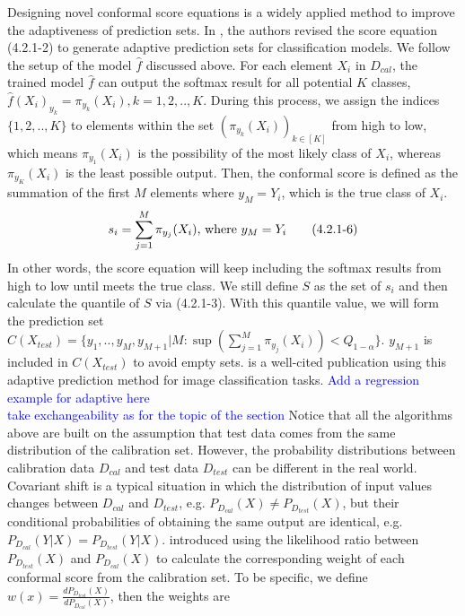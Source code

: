 \noindent Designing novel conformal score equations is a widely applied method to improve the adaptiveness of prediction sets. In \cite{romano2020classification}, the authors revised the score equation (4.2.1-2) to generate adaptive prediction sets for classification models.  We follow the setup of the model $\hat{f}$ discussed above. For each element $X_i$ in $D_{cal}$, the trained model $\hat{f}$ can output the softmax result for all potential $K$ classes, $\hat{f}(X_i)_{y_k}=\pi_{y_k}(X_i), k=1,2,..,K$.  During this process, we assign the indices $\{1,2,.., K\}$ to elements within the set $(\pi_{y_k}(X_i))_{k\in[K]}$ from high to low, which means $\pi_{y_1}(X_i)$ is the possibility of the most likely class of $X_i$, whereas $\pi_{y_K}(X_i)$ is the least possible output.  Then, the conformal score is defined as the summation of the first $M$ elements where $y_M=Y_i$, which is the true class of $X_i$. 
\begin{equation}
s_i = \sum_{j=1}^M \pi_{y_j}(X_i)\text{, where } y_M=Y_i\\\tag{4.2.1-6}
\end{equation}
In other words, the score equation will keep including the softmax results from high to low until meets the true class. We still define $S$ as the set of $s_i$ and then calculate the quantile of $S$ via (4.2.1-3). With this quantile value, we will form the prediction set $C(X_{test})=\{y_1,..,y_M,y_{M+1}|M:\sup(\sum_{j=1}^M \pi_{y_j}(X_i))<Q_{1-\alpha}\}$. $y_{M+1}$ is included in  $C(X_{test})$ to avoid empty sets. \cite{angelopoulos2020uncertainty} is a well-cited publication using this adaptive prediction method for image classification tasks.
\textcolor{blue}{Add a regression example for adaptive here}\\
\textcolor{blue}{take exchangeability as for the topic of the section}
\noindent Notice that all the algorithms above are built on the assumption that test data comes from the same distribution of the calibration set. However, the probability distributions between calibration data $D_{cal}$ and test data $D_{test}$ can be different in the real world. Covariant shift is a typical situation in which the distribution of input values changes between $D_{cal}$ and $D_{test}$, e.g. $P_{D_{cal}}(X)\neq P_{D_{test}}(X)$, but their conditional probabilities of obtaining the same output are identical, e.g. $P_{D_{cal}}(Y|X) = P_{D_{test}}(Y|X)$.  \cite{tibshirani2019conformal} introduced using the likelihood ratio between $P_{D_{test}}(X)$ and $P_{D_{cal}}(X)$ to calculate the corresponding weight of each conformal score from the calibration set. To be specific, we define $w(x)=\frac{dP_{D_{test}}(X)}{dP_{D_{cal}}(X)}$, then the weights are
